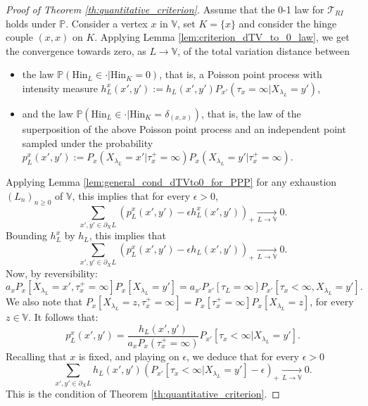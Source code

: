 \documentclass[10pt,a4paper]{amsart}
\newcommand{\Hin}{\mathrm{Hin}}
\begin{document}
\begin{proof}[Proof of Theorem \ref{th:quantitative_criterion}]
Assume that the 0-1 law for $\mathcal{T}_{RI}$ holds under $\mathbb{P}$. Consider a vertex $x$ in $\mathbb{V}$, set $K=\{x\}$ and consider the hinge couple $(x,x)$ on $K$. Applying Lemma \ref{lem:criterion_dTV_to_0_law}, we get the convergence towards zero, as $L\to\mathbb{V}$, of the total variation distance between 
\begin{itemize}
  \item the law 
  $\mathbb{P}(\Hin_L \in \cdot | \Hin_K=0)$, that is, a Poisson point process with intensity measure 
  $h_{L}^{x}(x',y') := h_L(x',y') P_{x'}(\tau_x=\infty|X_{\lambda_L}=y')$,
  \item and the law 
  $\mathbb{P}(\Hin_L \in \cdot | \Hin_K=\delta_{(x,x)})$, that is, the law of the superposition of the above Poisson point process and an independent point sampled under the probability 
  $p_{L}^{x}(x', y'):= P_x(X_{\lambda_L}= x'| \tau_x^+=\infty) P_x(X_{\lambda_L}= y'| \tau_x^+=\infty)$.
\end{itemize}
Applying Lemma \ref{lem:general_cond_dTVto0_for_PPP} for any exhaustion $(L_n)_{n\ge 0}$ of $\mathbb{V}$, this implies that for every $\epsilon>0$, 
\begin{equation}
  \sum_{x',y' \in \partial_X L} 
  \left(p_{L}^{ x}(x', y') 
  - \epsilon h_{L}^{x}(x',y') \right)_+  \underset{L \to \mathbb{V}}\longrightarrow 0.
\end{equation}
Bounding $h_{L}^{x}$ by $h_L$, this implies that  
\begin{equation}
  \sum_{x',y'\in  \partial_X L} 
  \left(p_{L}^{x}(x', y')  - \epsilon h_L(x', y')   \right)_+  
  \underset{L \to \mathbb{V}}{\longrightarrow} 0.
\end{equation}
Now, by reversibility:
\begin{equation}
  a_x  P_x[X_{\lambda_L}=x', \tau_x^+=\infty]    P_x[X_{\lambda_L}=y']  = a_{x'} P_{x'}[\tau_L=\infty]  P_{x'}[\tau_x < \infty, X_{  \lambda_L}=y'].
\end{equation}
We also note that $P_x[X_{\lambda_L} = z,\tau_x^+=\infty]= P_x[\tau_x^+=\infty] P_x[X_{\lambda_L} = z]$, for every $z\in \mathbb{V}$.
It follows that:
\begin{equation}\label{eq:rewrite_proba_induced_hinges_singleton}
 p_{L}^x(x', y') =  \frac{h_L(x', y')}{a_x P_x(\tau_x^+=\infty) } 
  P_{x'}[\tau_x < \infty | X_{\lambda_L}=y'].
\end{equation}
Recalling that $x$ is fixed, and playing on $\epsilon$, we deduce that for every $\epsilon>0$
\begin{equation}
  \sum_{x',y' \in \partial_X L} 
  h_L(x', y')
  \left(P_{x'}[\tau_x < \infty | X_{\lambda_L}=y']
  - \epsilon  \right)_+  \underset{L \to \mathbb{V}}{\longrightarrow} 0.
\end{equation}
This is the condition of Theorem \ref{th:quantitative_criterion}.


\end{proof}
\end{document}
